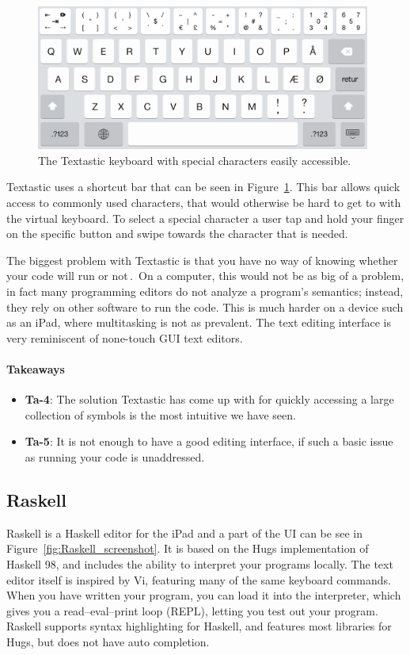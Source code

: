 \begin{figure}
	\centering
		\includegraphics[width=110mm]{diagrams/textastic_keyboard_screenshot.png}
	\caption{The Textastic keyboard with special characters easily accessible.}
\label{fig:textastic_keyboard_screenshot}
\end{figure}

Textastic uses a shortcut bar that can be seen in Figure~\ref{fig:textastic_keyboard_screenshot}. This bar allows quick access to commonly used characters, that would otherwise be hard to get to with the virtual keyboard. To select a special character a user tap and hold your finger on the specific button and swipe towards the character that is needed. 

The biggest problem with Textastic is that you have no way of knowing whether your code will run or not\,\cite{nielsen1990heuristic}.\ On a computer, this would not be as big of a problem, in fact many programming editors do not analyze a program's semantics; instead, they rely on other software to run the code. This is much harder on a device such as an iPad, where multitasking is not as prevalent. The text editing interface is very reminiscent of none-touch GUI text editors.

\paragraph{Takeaways}
\begin{itemize}
	\item \textbf{Ta-4}: The solution Textastic has come up with for quickly accessing a large collection of symbols is the most intuitive we have seen.
	\item \textbf{Ta-5}: It is not enough to have a good editing interface, if such a basic issue as running your code is unaddressed.
\end{itemize}


\subsection{Raskell}
\label{subsub:Raskell}
Raskell is a Haskell editor for the iPad and a part of the UI can be see in Figure~\ref{fig:Raskell_screenshot}. It is based on the Hugs implementation of Haskell 98, and includes the ability to interpret your programs locally. The text editor itself is inspired by Vi, featuring many of the same keyboard commands. When you have written your program, you can load it into the interpreter, which gives you a read–eval–print loop (REPL), letting you test out your program. Raskell supports syntax highlighting for Haskell, and features most libraries for Hugs, but does not have auto completion.

